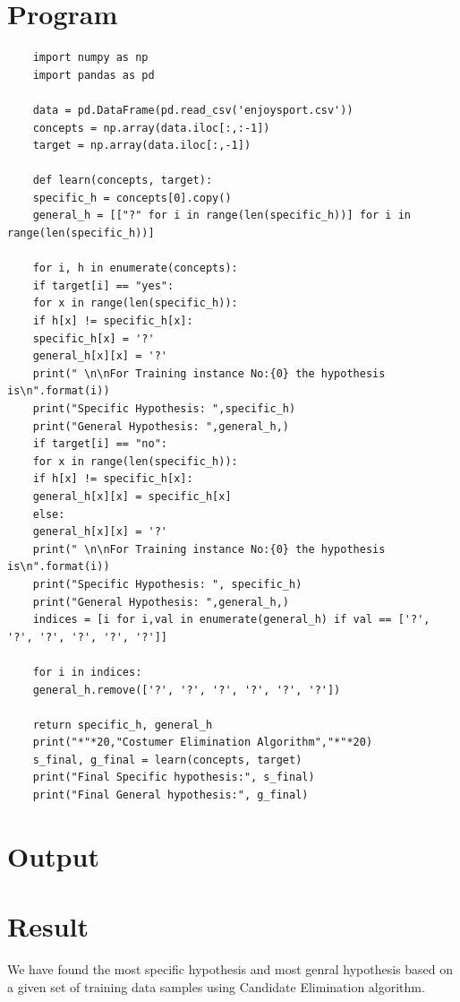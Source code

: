\documentclass[a4paper]{article}
\begin{document}
	\section{Program}
	\begin{verbatim}
	import numpy as np
	import pandas as pd
	
	data = pd.DataFrame(pd.read_csv('enjoysport.csv'))
	concepts = np.array(data.iloc[:,:-1])
	target = np.array(data.iloc[:,-1])
	
	def learn(concepts, target):
	specific_h = concepts[0].copy()
	general_h = [["?" for i in range(len(specific_h))] for i in range(len(specific_h))]
	
	for i, h in enumerate(concepts):                
	if target[i] == "yes":
	for x in range(len(specific_h)):
	if h[x] != specific_h[x]:
	specific_h[x] = '?'
	general_h[x][x] = '?'
	print(" \n\nFor Training instance No:{0} the hypothesis is\n".format(i))
	print("Specific Hypothesis: ",specific_h)
	print("General Hypothesis: ",general_h,)
	if target[i] == "no":            
	for x in range(len(specific_h)):
	if h[x] != specific_h[x]:
	general_h[x][x] = specific_h[x]
	else:
	general_h[x][x] = '?'
	print(" \n\nFor Training instance No:{0} the hypothesis is\n".format(i))
	print("Specific Hypothesis: ", specific_h)
	print("General Hypothesis: ",general_h,)
	indices = [i for i,val in enumerate(general_h) if val == ['?', '?', '?', '?', '?', '?']]
	
	for i in indices:
	general_h.remove(['?', '?', '?', '?', '?', '?'])
	
	return specific_h, general_h
	print("*"*20,"Costumer Elimination Algorithm","*"*20)
	s_final, g_final = learn(concepts, target)
	print("Final Specific hypothesis:", s_final)
	print("Final General hypothesis:", g_final)
	\end{verbatim}
	\section{Output}
	\section{Result}
	We have found the most specific hypothesis and most genral hypothesis based on a given set of training data samples using Candidate Elimination algorithm.
\end{document}
